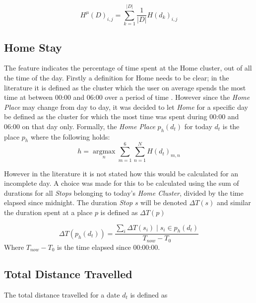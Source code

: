 $$H^{\mu} (D) _{i,j} = \sum_{k=1}^{|D|} \frac{1}{|D|} H(d_k)_{i,j}$$

\subsection{Home Stay}
The  feature indicates the percentage of time spent at the Home cluster, out of all the time of the day. Firstly a definition for Home needs to be clear; in the literature it is defined as the cluster which the user on average spends the most time at between 00:00 and 06:00 over a period of time \cite{Saeb2015, Canzian2015}. However since the \textit{Home Place} may change from day to day, it was decided to let \textit{Home} for a specific day be defined as the cluster for which the most time was spent during 00:00 and 06:00 on that day only. Formally, the \textit{Home Place} $p_h (d_t)$ for today $d_t$ is the place $p_h$ where the following holds:
$$h = \operatorname*{argmax}_n \sum_{m=1}^{6} \sum_{n=1}^{N} H(d_t)_{m,n}$$

However in the literature \cite{Saeb2015, Canzian2015} it is not stated how this would be calculated for an incomplete day. A choice was made for this to be calculated using the sum of durations for all \textit{Stops} belonging to today's \textit{Home Cluster}, divided by the time elapsed since midnight. The duration \textit{Stop} $s$ will be denoted $\Delta T (s)$ and similar the duration spent at a place $p$ is defined as $\Delta T (p)$

$$\Delta T(p_{h} (d_t) )= \frac{\sum_i \Delta T(s_i) \;|\; s_i \in p_h (d_t)}{T_{now} - T_{0}}$$
Where $T_{now} - T_0$ is the time elapsed since 00:00:00.

\subsection{Total Distance Travelled}
The total distance travelled for a date $d_t$ is defined as 

